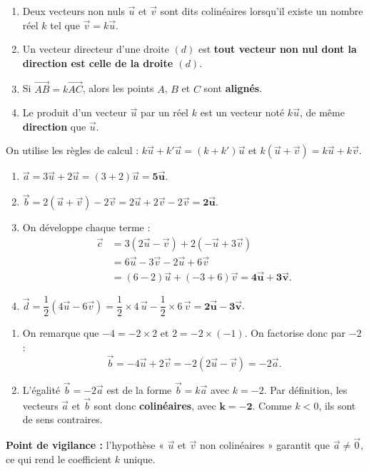 \documentclass[11pt]{article}
\newcommand{\cle}[1]{{\popxbold\color{popdark}#1}}
\begin{document}
\begin{corrige}
\begin{enumerate}
\item Deux vecteurs non nuls $\vec{u}$ et $\vec{v}$ sont dits \cle{colinéaires} lorsqu'il existe un nombre réel $k$ tel que \textbf{$\vec{v} = k\vec{u}$}.
\item Un \cle{vecteur directeur} d'une droite $(d)$ est \textbf{tout vecteur non nul dont la direction est celle de la droite $(d)$}.
\item Si $\overrightarrow{AB} = k\overrightarrow{AC}$, alors les points $A$, $B$ et $C$ sont \textbf{alignés}.
\item Le produit d'un vecteur $\vec{u}$ par un réel $k$ est un vecteur noté \textbf{$k\vec{u}$}, de même \textbf{direction} que $\vec{u}$.
\end{enumerate}
\end{corrige}

\begin{corrige}
On utilise les règles de calcul : $k\vec{u} + k'\vec{u} = (k+k')\vec{u}$ et $k(\vec{u}+\vec{v}) = k\vec{u} + k\vec{v}$.
\begin{enumerate}
\item $\vec{a} = 3\vec{u} + 2\vec{u} = (3+2)\vec{u} = \mathbf{5\vec{u}}$.
\item $\vec{b} = 2(\vec{u} + \vec{v}) - 2\vec{v} = 2\vec{u} + 2\vec{v} - 2\vec{v} = \mathbf{2\vec{u}}$.
\item On développe chaque terme :
\begin{align*}
\vec{c} &= 3(2\vec{u} - \vec{v}) + 2(-\vec{u} + 3\vec{v}) \\
&= 6\vec{u} - 3\vec{v} - 2\vec{u} + 6\vec{v} \\
&= (6-2)\vec{u} + (-3+6)\vec{v} = \mathbf{4\vec{u} + 3\vec{v}}.
\end{align*}
\item $\vec{d} = \dfrac{1}{2}\left(4\vec{u} - 6\vec{v}\right) = \dfrac{1}{2}\times 4\,\vec{u} - \dfrac{1}{2}\times 6\,\vec{v} = \mathbf{2\vec{u} - 3\vec{v}}$.
\end{enumerate}
\end{corrige}

\begin{corrige}
\begin{enumerate}
\item On remarque que $-4 = -2 \times 2$ et $2 = -2 \times (-1)$. On factorise donc par $-2$ :
\[ \vec{b} = -4\vec{u} + 2\vec{v} = -2\left(2\vec{u} - \vec{v}\right) = -2\vec{a}. \]
\item L'égalité $\vec{b} = -2\vec{a}$ est de la forme $\vec{b} = k\vec{a}$ avec $k = -2$. Par définition, les vecteurs $\vec{a}$ et $\vec{b}$ sont donc \textbf{colinéaires}, avec $\mathbf{k = -2}$. Comme $k < 0$, ils sont de sens contraires.
\end{enumerate}
\textbf{Point de vigilance :} l'hypothèse « $\vec{u}$ et $\vec{v}$ non colinéaires » garantit que $\vec{a} \neq \vec{0}$, ce qui rend le coefficient $k$ unique.
\end{corrige}
\end{document}
